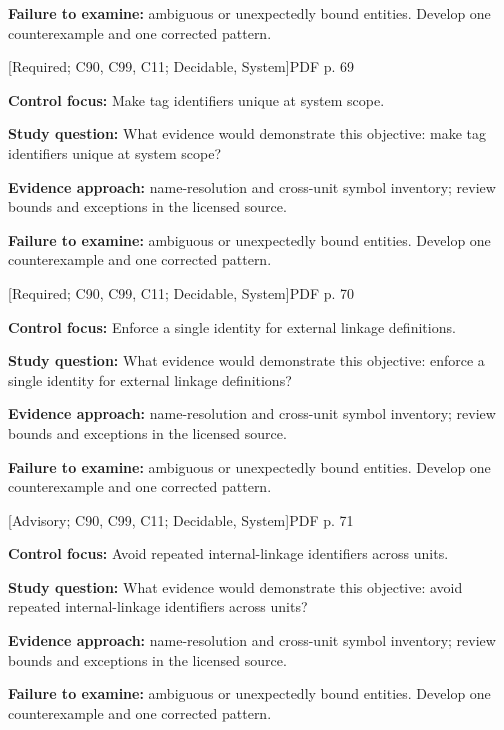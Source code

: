 \documentclass[10pt,letterpaper]{article}
\begin{document}
\textbf{Failure to examine:} ambiguous or unexpectedly bound entities. Develop one counterexample and one corrected pattern.\par
\smallskip
{}
 \textsf{\footnotesize [Required; C90, C99, C11; Decidable, System]}\hfill{\footnotesize PDF p. 69}\par
\textbf{Control focus:} Make tag identifiers unique at system scope.\par
\textbf{Study question:} What evidence would demonstrate this objective: make tag identifiers unique at system scope?\par
\textbf{Evidence approach:} name-resolution and cross-unit symbol inventory; review bounds and exceptions in the licensed source.\par
\textbf{Failure to examine:} ambiguous or unexpectedly bound entities. Develop one counterexample and one corrected pattern.\par
\smallskip
{}
 \textsf{\footnotesize [Required; C90, C99, C11; Decidable, System]}\hfill{\footnotesize PDF p. 70}\par
\textbf{Control focus:} Enforce a single identity for external linkage definitions.\par
\textbf{Study question:} What evidence would demonstrate this objective: enforce a single identity for external linkage definitions?\par
\textbf{Evidence approach:} name-resolution and cross-unit symbol inventory; review bounds and exceptions in the licensed source.\par
\textbf{Failure to examine:} ambiguous or unexpectedly bound entities. Develop one counterexample and one corrected pattern.\par
\smallskip
{}
 \textsf{\footnotesize [Advisory; C90, C99, C11; Decidable, System]}\hfill{\footnotesize PDF p. 71}\par
\textbf{Control focus:} Avoid repeated internal-linkage identifiers across units.\par
\textbf{Study question:} What evidence would demonstrate this objective: avoid repeated internal-linkage identifiers across units?\par
\textbf{Evidence approach:} name-resolution and cross-unit symbol inventory; review bounds and exceptions in the licensed source.\par
\textbf{Failure to examine:} ambiguous or unexpectedly bound entities. Develop one counterexample and one corrected pattern.\par
\smallskip
\end{document}
